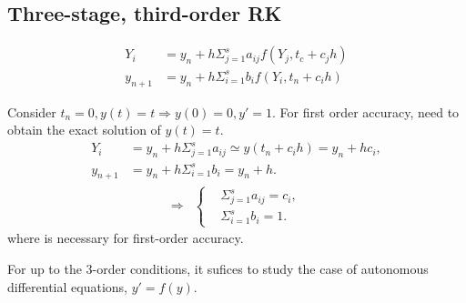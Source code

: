 \documentclass[prd,aps,a4paper,superscriptaddress,onecolumn,footinbib]{revtex4}
\begin{document}
\subsection{Three-stage, third-order RK}

\begin{align}
    Y_i
    &= y_n + h \Sigma_{j=1}^{s}a_{ij}f(Y_j, t_c+c_jh)
    \\
    y_{n+1}
    &=y_n + h \Sigma_{i=1}^{s}b_i f(Y_i, t_n+c_ih)
\end{align}

Consider $t_n=0, y(t)=t \Rightarrow y(0)=0, y'=1$. For first order accuracy, need to obtain the exact
solution of $y(t)=t$.
\begin{align}
    Y_i
    &=y_n+h\Sigma_{j=1}^s a_{ij} \simeq y(t_n+c_ih) = y_n+hc_i, \\
    y_{n+1}
    &=y_n + h\Sigma_{i=1}^sb_i = y_n + h.
\end{align}
\begin{align}
    \Rightarrow &
    \left\{
        \begin{matrix}
            &\Sigma_{j=1}^sa_{ij} = c_i, \\
            &\Sigma_{i=1}^sb_i = 1.
        \end{matrix}
    \right.
\end{align}
where is necessary for first-order accuracy.

For up to the 3-order conditions, it sufices to study the case of autonomous differential
equations, $y'=f(y)$.
\end{document}

